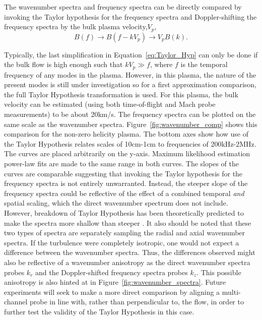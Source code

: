 \documentclass[manuscript]{aastex}
\begin{document}
The wavenumber spectra and frequency spectra can be directly compared by invoking the Taylor hypothesis for the frequency spectra and Doppler-shifting the frequency spectra by the bulk plasma velocity,$V_{p}$,
\begin{equation}
B(f) \longrightarrow B(f-kV_{p}) \longrightarrow V_{p}B(k).
\label{eq:Taylor_Hyp}
\end{equation}

Typically, the last simplification in Equation~\ref{eq:Taylor_Hyp} can only be done if the bulk flow is high enough such that $kV_{p} \gg f$, where $f$ is the temporal frequency of any modes in the plasma. However, in this plasma, the nature of the present modes is still under investigation so for a first approximation comparison, the full Taylor Hypothesis transformation is used. For this plasma, the bulk velocity can be estimated (using both time-of-flight and Mach probe measurements) to be about 20km/s. The frequency spectra can be plotted on the same scale as the wavenumber spectra. Figure~\ref{fig:wavenumber_comp} shows this comparison for the non-zero helicity plasma. The bottom axes show how use of the Taylor Hypothesis relates scales of 10cm-1cm to frequencies of 200kHz-2MHz. The curves are placed arbitrarily on the y-axis. Maximum likelihood estimation power-law fits are made to the same range in both curves. The slopes of the curves are comparable suggesting that invoking the Taylor hypothesis for the frequency spectra is not entirely unwarranted. Instead, the steeper slope of the frequency spectra could be reflective of the effect of a combined temporal {\it and} spatial scaling, which the direct wavenumber spectrum does not include. However, breakdown of Taylor Hypothesis has been theoretically predicted to make the spectra more shallow than steeper \citep{kle14}. It also should be noted that these two types of spectra are separately sampling the radial and axial wavenumber spectra. If the turbulence were completely isotropic, one would not expect a difference between the wavenumber spectra. Thus, the differences observed might also be reflective of a wavenumber anisotropy as the direct wavenumber spectra probes $k_{r}$ and the Doppler-shifted frequency spectra probes $k_{z}$. This possible anisotropy is also hinted at in Figure~\ref{fig:wavenumber_spectra}. Future experiments will seek to make a more direct comparison by aligning a multi-channel probe in line with, rather than perpendicular to, the flow, in order to further test the validity of the Taylor Hypothesis in this case.
\end{document}
